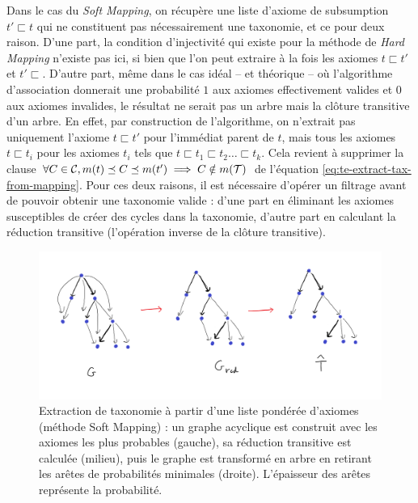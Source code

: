 Dans le cas du \textit{Soft Mapping}, on récupère une liste d'axiome de subsumption $t' \sqsubset t$ qui ne constituent pas nécessairement une taxonomie, et ce pour deux raison. D'une part, la condition d'injectivité qui existe pour la méthode de \textit{Hard Mapping} n'existe pas ici, si bien que l'on peut extraire à la fois les axiomes $t \sqsubset t'$ et $t' \sqsubset$. D'autre part, même dans le cas idéal – et théorique – où l'algorithme d'association donnerait une probabilité $1$ aux axiomes effectivement valides et $0$ aux axiomes invalides, le résultat ne serait pas un arbre mais la clôture transitive d'un arbre. En effet, par construction de l'algorithme, on n'extrait pas uniquement l'axiome $t \sqsubset t'$ pour l'immédiat parent de $t$, mais tous les axiomes $t \sqsubset t_i$ pour les axiomes $t_i$ tels que $t \sqsubset t_1 \sqsubset t_2 \ldots \sqsubset t_k$. Cela revient à supprimer la clause $\forall C \in \cal{C}, m(t) \preceq C \preceq m(t') \implies C \notin m(\cal{T})$ de l'équation \ref{eq:te-extract-tax-from-mapping}. Pour ces deux raisons, il est nécessaire d'opérer un filtrage avant de pouvoir obtenir une taxonomie valide : d'une part en éliminant les axiomes susceptibles de créer des cycles dans la taxonomie, d'autre part en calculant la réduction transitive (l'opération inverse de la clôture transitive).

\begin{figure}
    \centering
    \includegraphics[width=\textwidth]{img/softmapping_extraction.png}
    \caption[Extraction de taxonomie à partir d'un graphe acyclique]{Extraction de taxonomie à partir d'une liste pondérée d'axiomes (méthode Soft Mapping) : un graphe acyclique est construit avec les axiomes les plus probables (gauche), sa réduction transitive est calculée (milieu), puis le graphe est transformé en arbre en retirant les arêtes de probabilités minimales (droite). L'épaisseur des arêtes représente la probabilité.}
    \label{fig:softmapping-extraction}
\end{figure}

